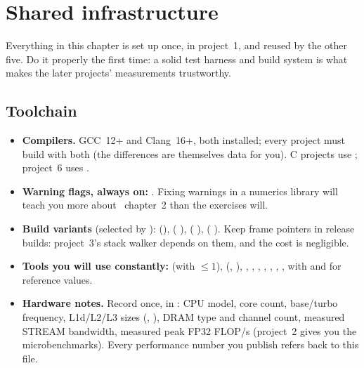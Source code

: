 \chapter{Shared infrastructure}
\label{ch:infra}

Everything in this chapter is set up once, in project~1, and reused by the other five. Do it properly the first time: a solid test harness and build system is what makes the later projects' measurements trustworthy.

\section{Toolchain}

\begin{itemize}
  \item \textbf{Compilers.} GCC~12+ and Clang~16+, both installed; every project must build with both (the differences are themselves data for you). C projects use ; project~6 uses .
  \item \textbf{Warning flags, always on:}   . Fixing  warnings in a numerics library will teach you more about \csapp\ chapter~2 than the exercises will.
  \item \textbf{Build variants} (selected by ):  (),  (  ),  ( ),  ( ). Keep frame pointers in release builds: project~3's stack walker depends on them, and the cost is negligible.
  \item \textbf{Tools you will use constantly:}  (with  $\le 1$),  (, ), , , , , , , ,  with  and  for reference values.
  \item \textbf{Hardware notes.} Record once, in : CPU model, core count, base/turbo frequency, L1d/L2/L3 sizes (, ), DRAM type and channel count, measured STREAM bandwidth, measured peak FP32 FLOP/s (project~2 gives you the microbenchmarks). Every performance number you publish refers back to this file.
\end{itemize}

